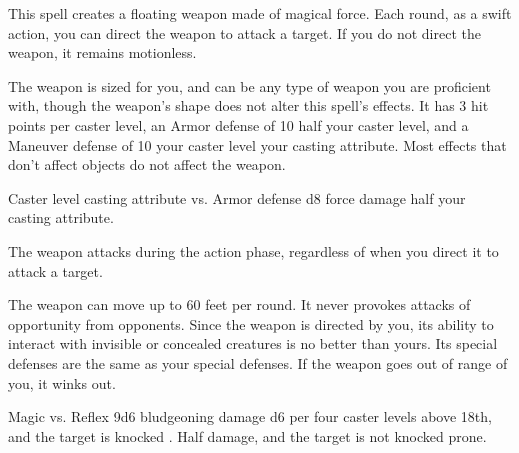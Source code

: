 \begin{spellheader}
    \spellrng{\rngmed}
    \spelldur{\durshort \dismissable}
\end{spellheader}
\begin{spelleffects}
    \spelleffect This spell creates a floating weapon made of magical force. Each round, as a swift action, you can direct the weapon to attack a target. If you do not direct the weapon, it remains motionless.

    The weapon is sized for you, and can be any type of weapon you are proficient with, though the weapon's shape does not alter this spell's effects. It has 3 hit points per caster level, an Armor defense of 10 \add half your caster level, and a Maneuver defense of 10 \add your caster level \add your casting attribute. Most effects that don't affect objects do not affect the weapon.

    \begin{spellattack}{Caster level \add casting attribute vs. Armor defense}
        \spellsuccess d8 force damage \add half your casting attribute.
    \end{spellattack}
\end{spelleffects}
\begin{spellfooter}
    \spellnotes The weapon attacks during the action phase, regardless of when you direct it to attack a target.

    The weapon can move up to 60 feet per round. It never provokes attacks of opportunity from opponents. Since the weapon is directed by you, its ability to interact with invisible or concealed creatures is no better than yours. Its special defenses are the same as your special defenses. If the weapon goes out of range of you, it winks out.
\end{spellfooter}

\begin{spellheader}
    \spelldur{\durshort \dismissable}
\end{spellheader}
\begin{spelleffects}
    \begin{spellattack}{Magic vs. Reflex}
        \spellsuccess 9d6 bludgeoning damage \add d6 per four caster levels above 18th, and the target is knocked \prone.
        \spellfailure Half damage, and the target is not knocked prone.
    \end{spellattack}
\end{spelleffects}
\begin{spellfooter}

\end{spellfooter}

